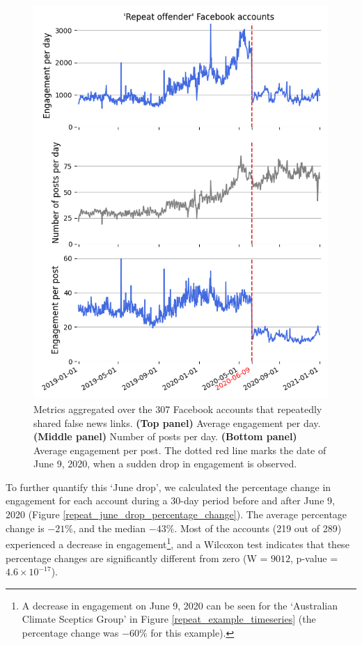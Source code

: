\documentclass[11pt,a4paper]{article}
\begin{document}
\begin{figure}[!h]
\centering
\includegraphics[width=\linewidth]{./../figure/repeat_average_timeseries.png}
\caption{
Metrics aggregated over the 307 Facebook accounts that repeatedly shared false news links. 
{\bf(Top panel)} Average engagement per day. 
{\bf(Middle panel)} Number of posts per day. 
{\bf(Bottom panel)} Average engagement per post. 
The dotted red line marks the date of June 9, 2020, when a sudden drop in engagement is observed.}
\label{repeat_average_timeseries}
\end{figure}

To further quantify this ‘June drop’, we calculated the percentage change in engagement for each account during a 30-day period before and after June 9, 2020 (Figure \ref{repeat_june_drop_percentage_change}). 
The average percentage change is $-21\%$, and the median $-43\%$. 
Most of the accounts (219 out of 289) experienced a decrease in engagement\footnote{A decrease in engagement on June 9, 2020 can be seen for the `Australian Climate Sceptics Group' in Figure \ref{repeat_example_timeseries} (the percentage change was $-60\%$ for this example).},
and a Wilcoxon test indicates that these percentage changes are significantly different from zero (W = $9012$, p-value = $4.6 \times 10^{-17}$).
\end{document}
